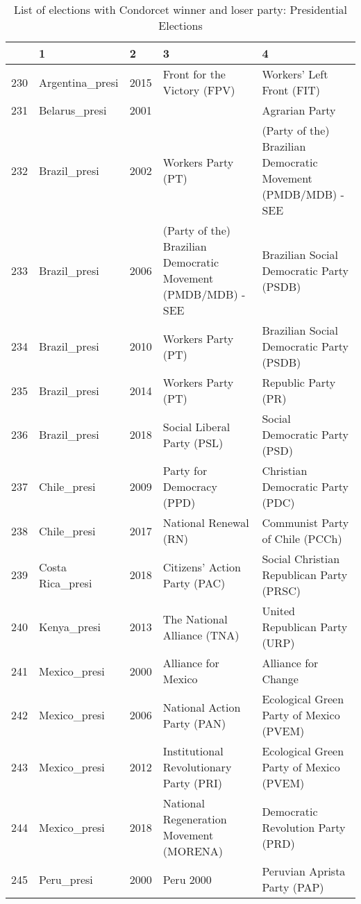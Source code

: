 \documentclass[12pt]{article}
\begin{document}
  \begin{table}[ht]
\centering
\caption{List of elections with Condorcet winner and loser party: Presidential Elections}
\begin{footnotesize}
\begin{tabular}{rllll}
  \hline
 & 1 & 2 & 3 & 4 \\ 
  \hline
  230 & Argentina\_presi & 2015 &   Front for the Victory (FPV) &   Workers' Left Front (FIT) \\ 
  231 & Belarus\_presi & 2001 &  &   Agrarian Party  \\ 
  232 & Brazil\_presi & 2002 &   Workers Party (PT) &   (Party of the) Brazilian Democratic Movement (PMDB/MDB) - SEE  \\ 
  233 & Brazil\_presi & 2006 &   (Party of the) Brazilian Democratic Movement (PMDB/MDB) - SEE  &   Brazilian Social Democratic Party (PSDB) \\ 
  234 & Brazil\_presi & 2010 &   Workers Party (PT) &   Brazilian Social Democratic Party (PSDB) \\ 
  235 & Brazil\_presi & 2014 &   Workers Party (PT) &   Republic Party (PR) \\ 
  236 & Brazil\_presi & 2018 &   Social Liberal Party (PSL) &   Social Democratic Party (PSD) \\ 
  237 & Chile\_presi & 2009 &   Party for Democracy (PPD) &   Christian Democratic Party (PDC) \\ 
  238 & Chile\_presi & 2017 &   National Renewal (RN) &   Communist Party of Chile (PCCh) \\ 
  239 & Costa Rica\_presi & 2018 &   Citizens' Action Party (PAC) &   Social Christian Republican Party (PRSC) \\ 
  240 & Kenya\_presi & 2013 &   The National Alliance (TNA) &   United Republican Party (URP) \\ 
  241 & Mexico\_presi & 2000 &   Alliance for Mexico &   Alliance for Change \\ 
  242 & Mexico\_presi & 2006 &   National Action Party (PAN) &   Ecological Green Party of Mexico (PVEM) \\ 
  243 & Mexico\_presi & 2012 &   Institutional Revolutionary Party (PRI) &   Ecological Green Party of Mexico (PVEM) \\ 
  244 & Mexico\_presi & 2018 &   National Regeneration Movement (MORENA) &   Democratic Revolution Party (PRD) \\ 
  245 & Peru\_presi & 2000 &   Peru 2000 &   Peruvian Aprista Party (PAP) \\ 

\end{tabular}
\end{footnotesize}
\end{table}
\end{document}
